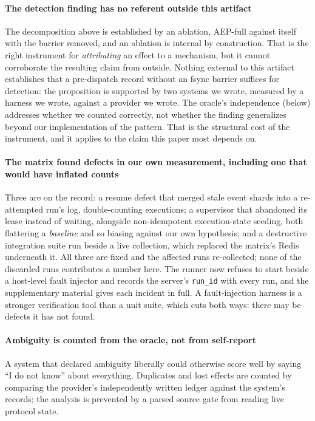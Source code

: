 \paragraph{The detection finding has no referent outside this artifact} The
decomposition above is established by an ablation, AEP-full against itself
with the barrier removed, and an ablation is internal by construction. That
is the right instrument for \emph{attributing} an effect to a mechanism, but it
cannot corroborate the resulting claim from outside. Nothing external to this
artifact establishes that a pre-dispatch record without an fsync barrier
suffices for detection: the proposition is supported by two systems we wrote,
measured by a harness we wrote, against a provider we wrote. The oracle's
independence (below) addresses whether we counted correctly, not whether the
finding generalizes beyond our implementation of the pattern. That is the
structural cost of the instrument, and it applies to the claim this paper
most depends on.

\paragraph{The matrix found defects in our own measurement, including one that
would have inflated counts} Three are on the record: a resume defect that
merged stale event shards into a re-attempted run's log, double-counting
executions; a supervisor that abandoned its lease instead of waiting, alongside
non-idempotent execution-state seeding, both flattering a \emph{baseline} and
so biasing against our own hypothesis; and a destructive integration suite run
beside a live collection, which replaced the matrix's Redis underneath it. All
three are fixed and the affected runs re-collected; none of the discarded runs
contributes a number here. The runner now refuses to start beside a host-level
fault injector and records the server's \texttt{run\_id} with every run, and
the supplementary material gives each incident in full. A fault-injection
harness is a stronger verification tool than a unit suite, which cuts both
ways: there may be defects it has not found.

\paragraph{Ambiguity is counted from the oracle, not from self-report} A system
that declared ambiguity liberally could otherwise score well by saying ``I do
not know'' about everything. Duplicates and lost effects are counted by
comparing the provider's independently written ledger against the system's
records; the analysis is prevented by a parsed source gate from reading live
protocol state.

